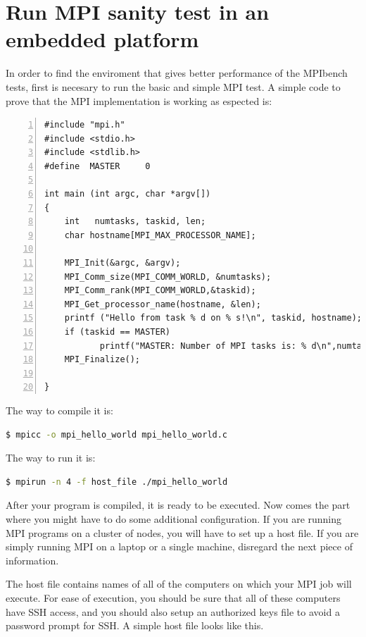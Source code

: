 \section{Run MPI sanity test in an embedded platform}

In order to find the enviroment that gives better performance of the MPIbench
tests, first is necesary to run the basic and simple MPI test. A simple code to
prove that the MPI implementation is working as espected is:

\begin{lstlisting}[frame=single,numbers=left,breaklines=true]
#include "mpi.h"
#include <stdio.h>
#include <stdlib.h>
#define  MASTER     0

int main (int argc, char *argv[])
{
    int   numtasks, taskid, len;
    char hostname[MPI_MAX_PROCESSOR_NAME];

    MPI_Init(&argc, &argv);
    MPI_Comm_size(MPI_COMM_WORLD, &numtasks);
    MPI_Comm_rank(MPI_COMM_WORLD,&taskid);
    MPI_Get_processor_name(hostname, &len);
    printf ("Hello from task % d on % s!\n", taskid, hostname);
    if (taskid == MASTER)
           printf("MASTER: Number of MPI tasks is: % d\n",numtasks);
    MPI_Finalize();

}
\end{lstlisting}

The way to compile it is: 

\begin{lstlisting}[frame=single,language=bash]
  $ mpicc -o mpi_hello_world mpi_hello_world.c
\end{lstlisting}


The way to run it is: 

\begin{lstlisting}[frame=single,language=bash]
  $ mpirun -n 4 -f host_file ./mpi_hello_world
\end{lstlisting}


After your program is compiled, it is ready to be executed. Now comes the part
where you might have to do some additional configuration. If you are running
MPI programs on a cluster of nodes, you will have to set up a host file. If you
are simply running MPI on a laptop or a single machine, disregard the next
piece of information.

The host file contains names of all of the computers on which your MPI job will
execute. For ease of execution, you should be sure that all of these computers
have SSH access, and you should also setup an authorized keys file to avoid a
password prompt for SSH. A simple host file looks like this.

